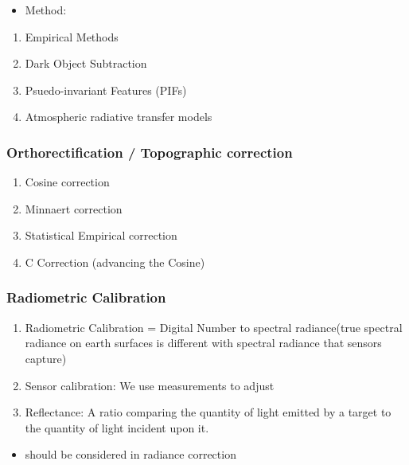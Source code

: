 \documentclass[
  letterpaper,
  DIV=11,
  numbers=noendperiod]{scrreprt}
\providecommand{\tightlist}{%
  \setlength{\itemsep}{0pt}\setlength{\parskip}{0pt}}\usepackage{longtable,booktabs,array}
\begin{document}
\begin{itemize}
\tightlist
\item
  Method:
\end{itemize}

\begin{enumerate}
\def\labelenumi{\arabic{enumi}.}
\tightlist
\item
  Empirical Methods
\item
  Dark Object Subtraction
\item
  Psuedo-invariant Features (PIFs)
\item
  Atmospheric radiative transfer models
\end{enumerate}

\hypertarget{orthorectification-topographic-correction}{%
\subsubsection{Orthorectification / Topographic
correction}\label{orthorectification-topographic-correction}}

\begin{enumerate}
\def\labelenumi{\arabic{enumi}.}
\tightlist
\item
  Cosine correction
\item
  Minnaert correction
\item
  Statistical Empirical correction
\item
  C Correction (advancing the Cosine)
\end{enumerate}

\hypertarget{radiometric-calibration}{%
\subsubsection{Radiometric Calibration}\label{radiometric-calibration}}

\begin{enumerate}
\def\labelenumi{\arabic{enumi}.}
\tightlist
\item
  Radiometric Calibration = Digital Number to spectral radiance(true
  spectral radiance on earth surfaces is different with spectral
  radiance that sensors capture)
\item
  Sensor calibration: We use measurements to adjust
\item
  Reflectance: A ratio comparing the quantity of light emitted by a
  target to the quantity of light incident upon it.
\end{enumerate}

\begin{itemize}
\tightlist
\item
  should be considered in radiance correction
\end{itemize}
\end{document}
